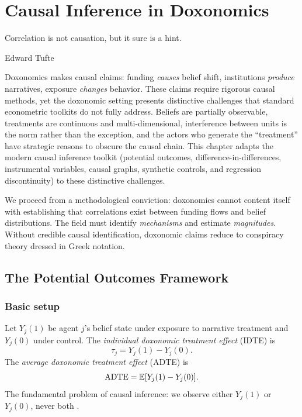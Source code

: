 \chapter{Causal Inference in Doxonomics}
\label{ch:causal-inference}

\epigraph{Correlation is not causation, but it sure is a hint.}{Edward Tufte}

\noindent
Doxonomics makes causal claims: funding \emph{causes} belief shift, institutions \emph{produce} narratives, exposure \emph{changes} behavior.
These claims require rigorous causal methods, yet the doxonomic setting presents distinctive challenges that standard econometric toolkits do not fully address.
Beliefs are partially observable, treatments are continuous and multi-dimensional, interference between units is the norm rather than the exception, and the actors who generate the ``treatment'' have strategic reasons to obscure the causal chain.
This chapter adapts the modern causal inference toolkit (potential outcomes, difference-in-differences, instrumental variables, causal graphs, synthetic controls, and regression discontinuity) to these distinctive challenges.

We proceed from a methodological conviction: doxonomics cannot content itself with establishing that correlations exist between funding flows and belief distributions.
The field must identify \emph{mechanisms} and estimate \emph{magnitudes}.
Without credible causal identification, doxonomic claims reduce to conspiracy theory dressed in Greek notation.

\section{The Potential Outcomes Framework}
\label{sec:ch16-potential}

\subsection{Basic setup}

\begin{definition}
\label{def:treatment-effect}
Let $Y_j(1)$ be agent $j$'s belief state under exposure to narrative treatment and $Y_j(0)$ under control.
The \emph{individual doxonomic treatment effect} (IDTE) is
\[
  \tau_j = Y_j(1) - Y_j(0).
\]
The \emph{average doxonomic treatment effect} (ADTE) is
\[
  \mathrm{ADTE} = \mathbb{E}[Y_j(1) - Y_j(0)].
\]
The fundamental problem of causal inference: we observe either $Y_j(1)$ or $Y_j(0)$, never both \autocite{rubin2005}.
\end{definition}

